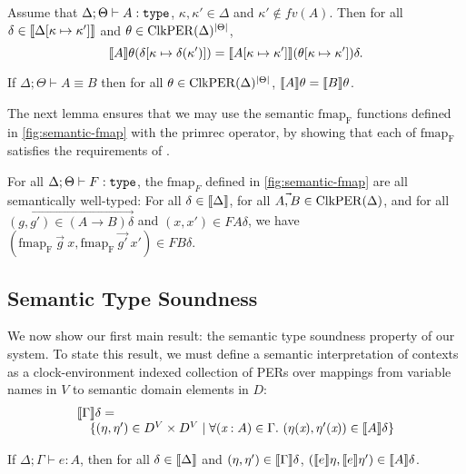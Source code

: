 \begin{lemma}\label{lem:substitution-lemma}
  Assume that $\Delta; \Theta \vdash A : \texttt{type}$, $\kappa, \kappa'
  \in \Delta$ and $\kappa' \not\in \mathit{fv}(A)$. Then for all
  $\delta \in \llbracket \Delta[\kappa\mapsto\kappa'] \rrbracket$ and $\theta \in
  \mathrm{ClkPER}(\Delta)^{|\Theta|}$,
  \begin{displaymath}
    \llbracket A \rrbracket\theta (\delta[\kappa \mapsto \delta(\kappa')]) = \llbracket A[\kappa\mapsto\kappa'] \rrbracket(\theta[\kappa\mapsto\kappa'])\delta.
  \end{displaymath}
\end{lemma}

\begin{lemma}\label{lem:type-equality}
  If $\Delta; \Theta \vdash A \equiv B$ then for all $\theta \in
  \mathrm{ClkPER}(\Delta)^{|\Theta|}$, $\llbracket A \rrbracket\theta = \llbracket B \rrbracket\theta$.
\end{lemma}

The next lemma ensures that we may use the semantic $\mathrm{fmap_F}$
functions defined in \autoref{fig:semantic-fmap} with the
$\mathrm{primrec}$ operator, by showing that each of $\mathrm{fmap_F}$
satisfies the requirements of .

\begin{lemma}\label{lem:sem-fmap-well-typed}
  For all $\Delta; \Theta \vdash F : \texttt{type}$, the $\mathrm{fmap}_F$
  defined in \autoref{fig:semantic-fmap} are all semantically
  well-typed: For all $\delta \in \llbracket \Delta \rrbracket$, for all $\vec{A,B}
  \in \mathrm{ClkPER}(\Delta)$, and for all $\vec{(g,g') \in (A \to B)\delta}$
  and $(x,x') \in FA\delta$, we have $(\mathrm{fmap_F}\ \vec{g}\ x,
  \mathrm{fmap_F}\ \vec{g'}\ x') \in FB\delta$.
\end{lemma}


\subsection{Semantic Type Soundness}\label{sec:semantic-soundness}

We now show our first main result: the semantic type soundness
property of our system. To state this result, we must define a
semantic interpretation of contexts as a clock-environment indexed
collection of PERs over mappings from variable names in $V$ to
semantic domain elements in $D$:
\begin{displaymath}
  \begin{array}{l}
    \llbracket \Gamma \rrbracket\delta =\\
    \quad\{(\eta, \eta') \in D^V \times D^V \mathrel| \forall (\textit{x} : A) \in \Gamma.\ (\eta(\textit{x}), \eta'(\textit{x})) \in \llbracket A \rrbracket\delta \}  
  \end{array}
\end{displaymath}

\begin{theorem}\label{thm:semantic-soundness}
  If $\Delta; \Gamma \vdash e : A$, then for all $\delta \in
  \llbracket \Delta \rrbracket$ and $(\eta,\eta') \in \llbracket \Gamma \rrbracket\delta$,
  $(\llbracket e \rrbracket\eta,\llbracket e \rrbracket\eta') \in \llbracket A \rrbracket\delta$.
\end{theorem}

